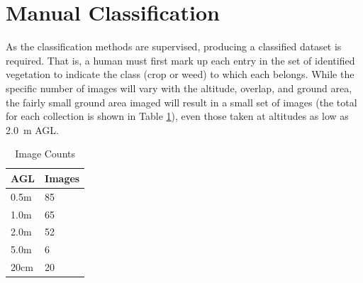 \documentclass[letterpaper]{article}
\begin{document}
{%

\section{Manual Classification}
As the classification methods are supervised, producing a classified dataset is required. That is, a human must first mark up each entry in the set of identified vegetation to indicate the class (crop or weed) to which each belongs.  While the specific number of images will vary with the altitude, overlap, and ground area, the fairly small ground area imaged will result in a small set of images (the total for each collection is shown in Table \ref{tab:acquisition}), even those taken at altitudes as low as \SI{2.0}{\meter} AGL.

\begin{table}
	\def\arraystretch{0.70}
	\caption{Image Counts}
 	\label{tab:acquisition}
 	\centering
 	\begin{tabular}[t]{ll} 
		\textbf{AGL} & \textbf{Images} \\
		\midrule
		      0.5m & 85  \\
		      1.0m & 65  \\
		      2.0m & 52 \\
		      5.0m & 6  \\
		      20cm & 20 
	\end{tabular}
\end{table}


}
\end{document}
